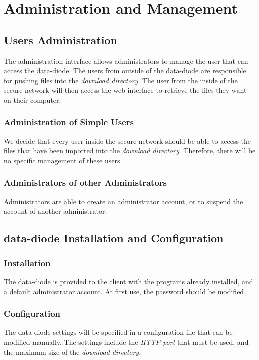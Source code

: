 \documentclass[a4paper,11pt]{article}
\begin{document}
\section{Administration and Management}
\subsection{Users Administration}
The administration interface allows administrators to manage the user that can access the data-diode. The users from outside of the data-diode are responsible for pushing files into the \textit{download directory}. The user from the inside of the secure network will then access the web interface to retrieve the files they want on their computer.

\subsubsection{Administration of Simple Users}
We decide that every user inside the secure network should be able to access the files that have been imported into the \textit{download directory}. Therefore, there will be no specific management of these users.

\subsubsection{Administrators of other Administrators}
Administrators are able to create an administrator account, or to suspend the account of another administrator.

\subsection{data-diode Installation and Configuration}

\subsubsection{Installation}
The data-diode is provided to the client with the programs already installed, and a default administrator account. At first use, the password should be modified.

\subsubsection{Configuration}
The data-diode settings will be specified in a configuration file that can be modified manually. The settings include the \textit{HTTP port} that must be used, and the maximum size of the \textit{download directory}.
\end{document}
